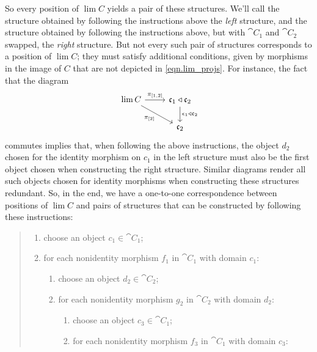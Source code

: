 \documentclass[Book-Poly]{subfiles}
\begin{document}
\begin{example}
So every position of $\lim C$ yields a pair of these structures.
We'll call the structure obtained by following the instructions above the \emph{left} structure, and the structure obtained by following the instructions above, but with $\cat{C}_1$ and $\cat{C}_2$ swapped, the \emph{right} structure.
But not every such pair of structures corresponds to a position of $\lim C$; they must satisfy additional conditions, given by morphisms in the image of $C$ that are not depicted in \eqref{eqn.lim_projs}.
For instance, the fact that the diagram
\begin{equation}
\begin{tikzcd}
    \lim C \ar[r, "\pi_{[1,2]}"] \ar[dr, "\pi_{[2]}"'] & \ema{c}_1 \tri \ema{c}_2 \ar[d, "\epsilon_1 \tri \ema{c}_2"] \\
    & \ema{c}_2
\end{tikzcd}
\end{equation}
commutes implies that, when following the above instructions, the object $d_2$ chosen for the identity morphism on $c_1$ in the left structure must also be the first object chosen when constructing the right structure.
Similar diagrams render all such objects chosen for identity morphisms when constructing these structures redundant.
So, in the end, we have a one-to-one correspondence between positions of $\lim C$ and pairs of structures that can be constructed by following these instructions:
\begin{quote}
\begin{enumerate}[label=1.\arabic*.]
    \item choose an object $c_1 \in \cat{C}_1$;
    \item for each nonidentity morphism $f_1$ in $\cat{C}_1$ with domain $c_1$:
    \begin{enumerate}[label=2.\arabic*.]
        \item choose an object $d_2 \in \cat{C}_2$;
        \item for each nonidentity morphism $g_2$ in $\cat{C}_2$ with domain $d_2$:
        \begin{enumerate}[label=3.\arabic*.]
            \item choose an object $c_3 \in \cat{C}_1$;
            \item for each nonidentity morphism $f_3$ in $\cat{C}_1$ with domain $c_3$:
            

\end{enumerate}
\end{enumerate}
\end{enumerate}
\end{quote}
\end{example}
\end{document}
